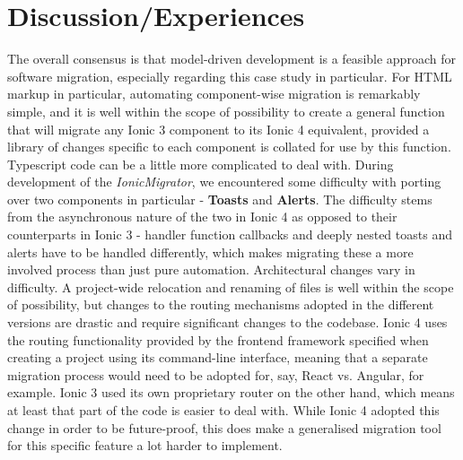 \documentclass[conference]{IEEEtran}
\begin{document}
\section{Discussion/Experiences}
The overall consensus is that model-driven development is a feasible approach
for software migration, especially regarding this case study in particular.
\newline
For HTML markup in particular, automating component-wise migration is remarkably simple, and it
is well within the scope of possibility to create a general function that will migrate any Ionic
3 component to its Ionic 4 equivalent, provided a library of changes specific to each component
is collated for use by this function.
\newline
Typescript code can be a little more complicated to deal with. During development of the \textit{IonicMigrator},
we encountered some difficulty with porting over two components in particular - \textbf{Toasts} and
\textbf{Alerts}. The difficulty stems from the asynchronous nature of the two in Ionic 4 as opposed to their
counterparts in Ionic 3 - handler function callbacks and deeply nested toasts and alerts have to be handled differently,
which makes migrating these a more involved process than just pure automation.
\newline
Architectural changes vary in difficulty. A project-wide relocation and renaming of files is well within the
scope of possibility, but changes to the routing mechanisms adopted in the different versions are drastic and
require significant changes to the codebase. Ionic 4 uses the routing functionality provided by the frontend framework
specified when creating a project using its command-line interface, meaning that a separate migration process would need
to be adopted for, say, React vs. Angular, for example. Ionic 3 used its own proprietary router on the other hand, which means
at least that part of the code is easier to deal with. While Ionic 4 adopted this change in order to be future-proof, this does
make a generalised migration tool for this specific feature a lot harder to implement.

\end{document}
